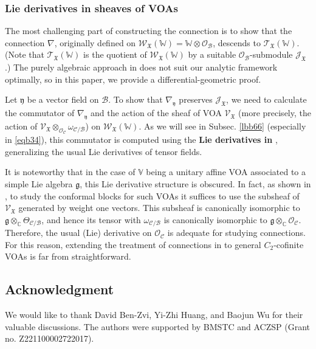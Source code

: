 \documentclass[11pt,b5paper,notitlepage]{article}
\theoremstyle{definition}
\theoremstyle{plain}
\newcommand{\scr}{\mathscr}
\newcommand{\gk}{\mathfrak g}
\newcommand{\yk}{\mathfrak y}
\newcommand{\Vbb}{\mathbb V}
\newcommand{\Wbb}{\mathbb W}
\newcommand{\Cbb}{\mathbb C}
\newcommand{\<}{\left\langle}
\renewcommand{\>}{\right\rangle}
\newcommand{\MO}{\mathcal{O}}
\newcommand{\MC}{\mathcal{C}}
\newcommand{\MB}{\mathcal{B}}
\newcommand{\fx}{\mathfrak{X}}
\newcommand{\SJ}{\mathscr{J}}
\numberwithin{equation}{subsection}
\begin{document}
\subsubsection*{Lie derivatives in sheaves of VOAs}


The most challenging part of constructing the connection  is to show that the connection $\nabla$, originally defined on $\scr W_\fx(\Wbb)=\Wbb\otimes\MO_\MB$, descends to $\scr T_\fx(\Wbb)$. (Note that $\scr T_\fx(\Wbb)$ is the quotient of $\scr W_\fx(\Wbb)$ by a suitable $\MO_\MB$-submodule $\SJ_\fx$.) The purely algebraic approach in \cite{FB04} does not suit our analytic framework optimally, so in this paper, we provide a differential-geometric proof.

Let $\yk$ be a vector field on $\MB$. To show that $\nabla_\yk$ preserves $\SJ_\fx$, we need to calculate the commutator of $\nabla_\yk$ and the action of the sheaf of VOA $\scr V_\fx$ (more precisely, the action of $\scr V_\fx\otimes_{\MO_\MC}\omega_{\MC/\MB}$) on $\scr W_\fx(\Wbb)$. As we will see in Subsec. \ref{lbb66} (especially in \eqref{eqb34}), this commutator is computed using the \textbf{Lie derivatives in \pmb{$\scr V_\fx\otimes\omega_{\MC/\MB}$}}, generalizing the usual Lie derivatives of tensor fields. 


It is noteworthy that in the case of $\Vbb$ being a unitary affine VOA associated to a simple Lie algebra $\gk$, this Lie derivative structure is obscured. In fact, as shown in \cite{TUY}, to study the conformal blocks for such VOAs it suffices to use the subsheaf of $\scr V_\fx$ generated by weight one vectors. This subsheaf is canonically isomorphic to $\gk\otimes_\Cbb\Theta_{\MC/\MB}$, and hence its tensor with $\omega_{\MC/\MB}$ is canonically isomorphic to $\gk\otimes_\Cbb\MO_\MC$. Therefore, the usual (Lie) derivative on $\MO_\MC$ is adequate for studying connections. For this reason, extending the treatment of connections in \cite{TUY} to general $C_2$-cofinite VOAs is far from straightforward.




\subsection*{Acknowledgment}



We would like to thank David Ben-Zvi, Yi-Zhi Huang, and Baojun Wu for their valuable discussions. The authors were supported by BMSTC and ACZSP (Grant no. Z221100002722017).
\end{document}
